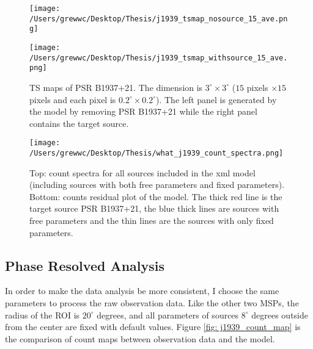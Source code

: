 \documentclass[12pt]{report}
\begin{document}
            \begin{figure}[!ht]
              \centering
              \begin{minipage}{0.40\textwidth}
                \begin{center} 
                  \texttt{[image: /Users/grewwc/Desktop/Thesis/j1939\_tsmap\_nosource\_15\_ave.png]}
                \end{center}
              \end{minipage}
              \begin{minipage}{0.40\textwidth}
                \begin{center}
                  \texttt{[image: /Users/grewwc/Desktop/Thesis/j1939\_tsmap\_withsource\_15\_ave.png]}
                \end{center}
              \end{minipage}
              \caption{TS maps of PSR B1937+21. The dimension is $3^{\circ} \times 3^{\circ}$
                ($15$ pixels $\times 15$ pixels and each pixel is 
                $0.2^{\circ} \times 0.2^{\circ}$). The left panel is generated by the model 
                by removing PSR B1937+21 while the right panel contains the target source.}
              \label{fig: j1939_tsmap_comparison_15_ave}
            \end{figure}
  

            \begin{figure}
              \centering 
              \texttt{[image: /Users/grewwc/Desktop/Thesis/what\_j1939\_count\_spectra.png]}
              \caption{Top: count spectra for all sources included in the xml model (including 
              sources with both free parameters and fixed parameters). Bottom: counts residual plot
              of the model. The thick red line is the target source PSR B1937+21, the blue thick 
              lines are sources with free parameters and the thin lines are the sources with only 
              fixed parameters.}
              \label{fig: j1939_count_spectra_ave}
            \end{figure}





          \subsection{Phase Resolved Analysis}
            In order to make the data analysis be more consistent, I choose the same parameters
            to process the raw observation data. Like the other two MSPs, the radius of the ROI 
            is $20^{\circ}$ degrees, and all parameters of sources $8^{\circ}$ degrees outside 
            from the center are fixed with default values. Figure \ref{fig: j1939_count_map} is 
            the comparison of count maps between observation data and the model.
\end{document}
